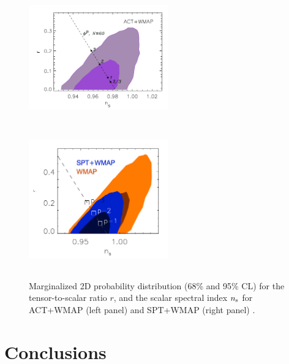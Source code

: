 \documentclass{rmaa}
\begin{document}
\begin{figure}[h!]
 \includegraphics[trim = 1mm 1mm 1mm 1mm, clip, width=6cm, height=6cm]{ACT}
  \includegraphics[trim = 1mm 1mm 1mm 1mm, clip, width=6cm, height=6cm]{SPT}
\caption{Marginalized 2D probability distribution (68\% and 95\% CL) for the 
tensor-to-scalar ratio $r$, and the scalar spectral index $n_{\rm s}$ for ACT+WMAP (left panel)
and SPT+WMAP (right panel)
 \citep{ACT,SPT}.}
 \label{fig:SPT}
\end{figure}

\section{Conclusions}
\end{document}
